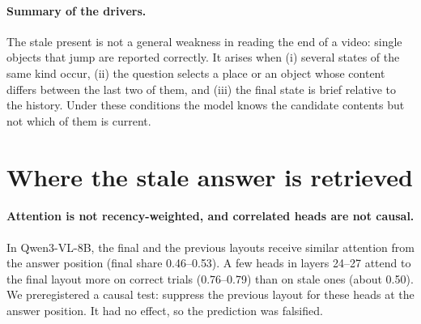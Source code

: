 \documentclass[10pt,twocolumn,letterpaper]{article}
\begin{document}
\paragraph{Summary of the drivers.} The stale present is not a general weakness in reading the end of a video: single objects that jump are reported correctly. It arises when (i) several states of the same kind occur, (ii) the question selects a place or an object whose content differs between the last two of them, and (iii) the final state is brief relative to the history. Under these conditions the model knows the candidate contents but not which of them is current.

\section{Where the stale answer is retrieved}
\label{sec:mechanism}

\paragraph{Attention is not recency-weighted, and correlated heads are not causal.} In Qwen3-VL-8B, the final and the previous layouts receive similar attention from the answer position (final share 0.46--0.53). A few heads in layers 24--27 attend to the final layout more on correct trials (0.76--0.79) than on stale ones (about 0.50). We preregistered a causal test: suppress the previous layout for these heads at the answer position. It had no effect, so the prediction was falsified.
\end{document}
